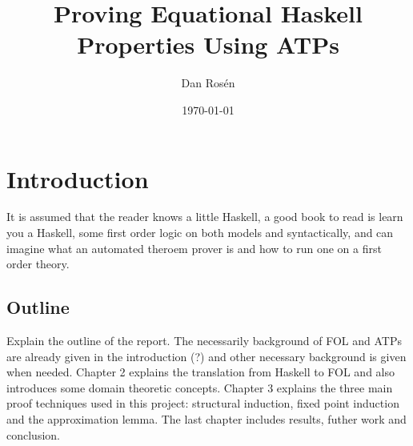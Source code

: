 \documentclass{book}
\begin{document}
\title{Proving Equational Haskell Properties Using ATPs}
\author{Dan Rosén}
\date{\today}
\maketitle


\newpage
{}




\newpage
\tableofcontents
{}

\newpage
\setcounter{page}{1}


\chapter{Introduction}



It is assumed that the reader knows a little Haskell, a good book to
read is learn you a Haskell, some first order logic on both models and
syntactically, and can imagine what an automated theroem prover is and
how to run one on a first order theory.



\section{Outline}

Explain the outline of the report.  The necessarily background of FOL
and ATPs are already given in the introduction (?) and other
necessary background is given when needed.
Chapter 2 explains the translation from Haskell to FOL and also
introduces some domain theoretic concepts. Chapter 3 explains the
three main proof techniques used in this project: structural
induction, fixed point induction and the approximation lemma. The last
chapter includes results, futher work and conclusion.
\end{document}

